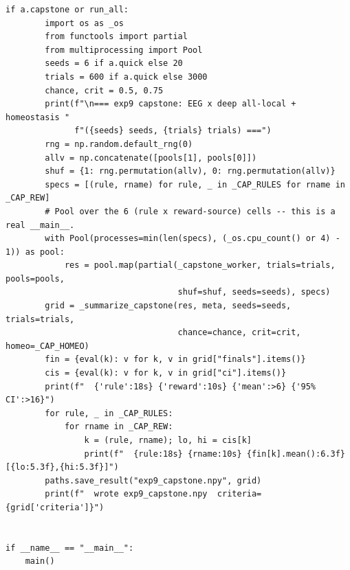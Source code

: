 \begin{lstlisting}[caption={mrl\_trace/biosignal.py},label={lst:siox-src-biosignal}]
    if a.capstone or run_all:
        import os as _os
        from functools import partial
        from multiprocessing import Pool
        seeds = 6 if a.quick else 20
        trials = 600 if a.quick else 3000
        chance, crit = 0.5, 0.75
        print(f"\n=== exp9 capstone: EEG x deep all-local + homeostasis "
              f"({seeds} seeds, {trials} trials) ===")
        rng = np.random.default_rng(0)
        allv = np.concatenate([pools[1], pools[0]])
        shuf = {1: rng.permutation(allv), 0: rng.permutation(allv)}
        specs = [(rule, rname) for rule, _ in _CAP_RULES for rname in _CAP_REW]
        # Pool over the 6 (rule x reward-source) cells -- this is a real __main__.
        with Pool(processes=min(len(specs), (_os.cpu_count() or 4) - 1)) as pool:
            res = pool.map(partial(_capstone_worker, trials=trials, pools=pools,
                                   shuf=shuf, seeds=seeds), specs)
        grid = _summarize_capstone(res, meta, seeds=seeds, trials=trials,
                                   chance=chance, crit=crit, homeo=_CAP_HOMEO)
        fin = {eval(k): v for k, v in grid["finals"].items()}
        cis = {eval(k): v for k, v in grid["ci"].items()}
        print(f"  {'rule':18s} {'reward':10s} {'mean':>6} {'95% CI':>16}")
        for rule, _ in _CAP_RULES:
            for rname in _CAP_REW:
                k = (rule, rname); lo, hi = cis[k]
                print(f"  {rule:18s} {rname:10s} {fin[k].mean():6.3f} [{lo:5.3f},{hi:5.3f}]")
        paths.save_result("exp9_capstone.npy", grid)
        print(f"  wrote exp9_capstone.npy  criteria={grid['criteria']}")


if __name__ == "__main__":
    main()
\end{lstlisting}


